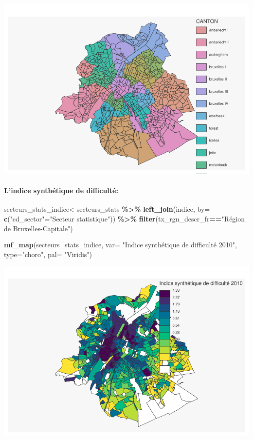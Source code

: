 \documentclass[
]{book}
\newenvironment{Shaded}{\begin{snugshade}}{\end{snugshade}}
\newcommand{\AttributeTok}[1]{\textcolor[rgb]{0.13,0.29,0.53}{#1}}
\newcommand{\FunctionTok}[1]{\textcolor[rgb]{0.13,0.29,0.53}{\textbf{#1}}}
\newcommand{\NormalTok}[1]{#1}
\newcommand{\OtherTok}[1]{\textcolor[rgb]{0.56,0.35,0.01}{#1}}
\newcommand{\SpecialCharTok}[1]{\textcolor[rgb]{0.81,0.36,0.00}{\textbf{#1}}}
\newcommand{\StringTok}[1]{\textcolor[rgb]{0.31,0.60,0.02}{#1}}
\begin{document}
\includegraphics{bookdown-demo_files/figure-latex/unnamed-chunk-34-1.pdf}

\hypertarget{lindice-synthuxe9tique-de-difficultuxe9}{%
\paragraph{L'indice synthétique de difficulté:}\label{lindice-synthuxe9tique-de-difficultuxe9}}

\begin{Shaded}
\begin{Highlighting}[]
\NormalTok{secteurs\_stats\_indice}\OtherTok{\textless{}{-}}\NormalTok{secteurs\_stats }\SpecialCharTok{\%\textgreater{}\%}
  \FunctionTok{left\_join}\NormalTok{(indice, }\AttributeTok{by=} \FunctionTok{c}\NormalTok{(}\StringTok{"cd\_sector"}\OtherTok{=}\StringTok{"Secteur statistique"}\NormalTok{)) }\SpecialCharTok{\%\textgreater{}\%}
  \FunctionTok{filter}\NormalTok{(tx\_rgn\_descr\_fr}\SpecialCharTok{==}\StringTok{"Région de Bruxelles{-}Capitale"}\NormalTok{)}

\FunctionTok{mf\_map}\NormalTok{(secteurs\_stats\_indice,}
       \AttributeTok{var=} \StringTok{"Indice synthétique de difficulté 2010"}\NormalTok{,}
       \AttributeTok{type=}\StringTok{"choro"}\NormalTok{,}
       \AttributeTok{pal=} \StringTok{"Viridis"}\NormalTok{)}
\end{Highlighting}
\end{Shaded}

\includegraphics{bookdown-demo_files/figure-latex/unnamed-chunk-35-1.pdf}
\end{document}

